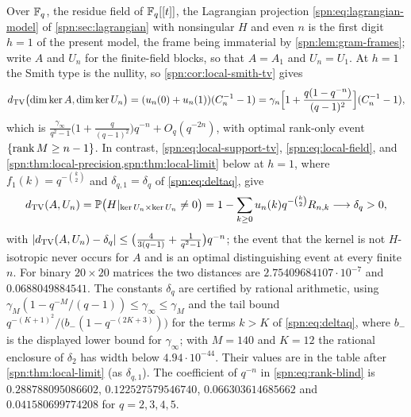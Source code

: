 \begin{remark}\label{spn:thm:rank-blind}
Over $\mathbb{F}_q$, the residue field of $\mathbb{F}_q[[t]]$, the Lagrangian projection
\eqref{spn:eq:lagrangian-model} of \cref{spn:sec:lagrangian} with nonsingular $H$ and even $n$ is
the first digit $h=1$ of the present model, the frame being immaterial by
\cref{spn:lem:gram-frames}; write $A$ and $U_n$ for the finite-field blocks, so that $A=A_1$ and
$U_n=U_1$. At $h=1$ the Smith type is the nullity, so \cref{spn:cor:local-smith-tv} gives
\begin{equation}\label{spn:eq:rank-blind}
 d_{\mathrm{TV}}\bigl(\dim\ker A,\dim\ker U_n\bigr)=(u_n(0)+u_n(1))(C_n^{-1}-1)
 =\gamma_n\Bigl[1+\frac{q(1-q^{-n})}{(q-1)^2}\Bigr](C_n^{-1}-1),
\end{equation}
which is
$\frac{\gamma_\infty}{q^2-1}\bigl(1+\frac{q}{(q-1)^2}\bigr)q^{-n}+O_q(q^{-2n})$, with optimal
rank-only event $\{\operatorname{rank} M\ge n-1\}$. In contrast, \eqref{spn:eq:local-support-tv},
\eqref{spn:eq:local-field}, and \cref{spn:thm:local-precision,spn:thm:local-limit} below at $h=1$,
where $f_1(k)=q^{-\binom k2}$ and $\delta_{q,1}=\delta_q$ of \eqref{spn:eq:deltaq}, give
\begin{equation}\label{spn:eq:full-blind}
 d_{\mathrm{TV}}(A,U_n)=\mathbb{P}\bigl(H|_{\ker U_n\times\ker U_n}\ne0\bigr)
 =1-\sum_{k\ge0}u_n(k)q^{-\binom k2}R_{n,k}\longrightarrow\delta_q>0 ,
\end{equation}
with $\lvert d_{\mathrm{TV}}(A,U_n)-\delta_q\rvert\le\bigl(\tfrac4{3(q-1)}+\tfrac1{q^2-1}\bigr)q^{-n}$; the event that
the kernel is not $H$-isotropic never occurs for $A$ and is an optimal distinguishing event at
every finite $n$. For binary $20\times20$ matrices the two distances are
$2.75409684107\cdot10^{-7}$ and $0.0688049884541$. The constants $\delta_q$ are certified by
rational arithmetic, using $\gamma_M(1-q^{-M}/(q-1))\le\gamma_\infty\le\gamma_M$ and the tail bound
$q^{-(K+1)^2}/\bigl(b_-(1-q^{-(2K+3)})\bigr)$ for the terms $k>K$ of \eqref{spn:eq:deltaq}, where
$b_-$ is the displayed lower bound for $\gamma_\infty$; with $M=140$ and $K=12$ the rational
enclosure of $\delta_2$ has width below $4.94\cdot10^{-44}$. Their values are in the table after
\cref{spn:thm:local-limit} (as $\delta_{q,1}$). The coefficient of $q^{-n}$ in
\eqref{spn:eq:rank-blind} is $0.288788095086602$, $0.122527579546740$, $0.066303614685662$ and
$0.041580699774208$ for $q=2,3,4,5$.
\end{remark}

